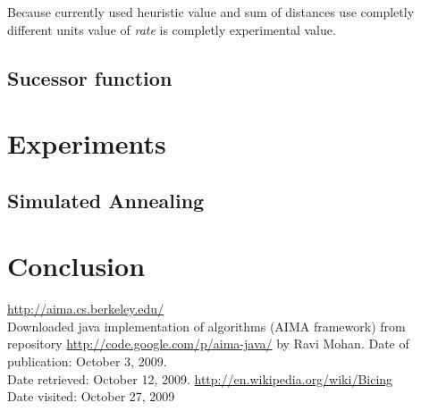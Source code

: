 \documentclass[11pt,twoside,a4paper]{mr}%
\begin{document}
Because currently used heuristic value and sum of distances use completly different units value of \textsl{rate} is completly experimental value.


\section{Sucessor function}


\chapter{Experiments}

\section{Simulated Annealing}



\chapter{Conclusion}

\clearpage
\begin{thebibliography}{9}
		\url{http://aima.cs.berkeley.edu/} \\
		{Downloaded java implementation of algorithms (AIMA framework) from repository \url{http://code.google.com/p/aima-java/} by Ravi Mohan. Date of publication: October 3, 2009. \\
		Date retrieved: October 12, 2009. }
\url{http://en.wikipedia.org/wiki/Bicing}\\
{Date visited: October 27, 2009}


\end{thebibliography}
\end{document}
